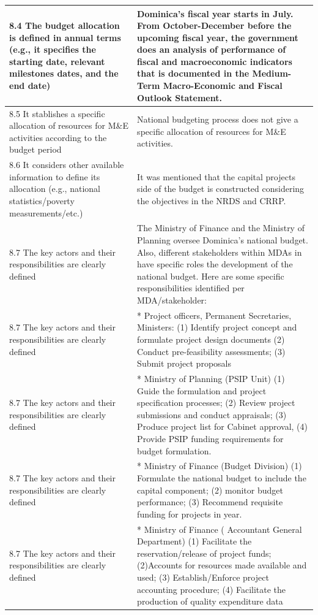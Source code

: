 \documentclass[
  10pt,
]{book}
\begin{document}
\begin{table}
\begin{tabular}[t]{l|l}
\hline
8.4 The budget allocation is defined in annual terms (e.g., it specifies the starting date, relevant milestones dates, and the end date) & Dominica’s fiscal year starts in July. From October-December before the upcoming fiscal year, the government does an analysis of performance of fiscal and macroeconomic indicators that is documented in the Medium-Term Macro-Economic and Fiscal Outlook Statement.\\
\hline
8.5 It stablishes a specific allocation of resources for M\&E activities according to the budget period & National budgeting process does not give a specific allocation of resources for M\&E activities.\\
\hline
8.6 It considers other available information to define its allocation (e.g., national statistics/poverty measurements/etc.) & It was mentioned that the capital projects side of the budget is constructed considering the objectives in the NRDS and CRRP.\\
\hline
8.7 The key actors and their responsibilities are clearly defined & The Ministry of Finance and the Ministry of Planning oversee Dominica’s national budget. Also, different stakeholders within MDAs in have specific roles the development of the national budget. Here are some specific responsibilities identified per MDA/stakeholder:\\
\hline
8.7 The key actors and their responsibilities are clearly defined & * Project officers, Permanent Secretaries, Ministers: (1) Identify project concept and formulate project design documents (2) Conduct pre-feasibility assessments; (3) Submit project proposals\\
\hline
8.7 The key actors and their responsibilities are clearly defined & * Ministry of Planning (PSIP Unit) (1) Guide the formulation and project specification processes; (2) Review project submissions and conduct appraisals; (3) Produce project list for Cabinet approval, (4) Provide PSIP funding requirements for budget formulation.\\
\hline
8.7 The key actors and their responsibilities are clearly defined & * Ministry of Finance (Budget Division) (1) Formulate the national budget to include the capital component; (2) monitor budget performance; (3) Recommend requisite funding for projects in year.\\
\hline
8.7 The key actors and their responsibilities are clearly defined & * Ministry of Finance ( Accountant General Department) (1) Facilitate the reservation/release of project funds; (2)Accounts for resources made available and used; (3) Establish/Enforce project accounting procedure; (4) Facilitate the production of quality expenditure data\\
\hline
\end{tabular}
\end{table}
\end{document}
